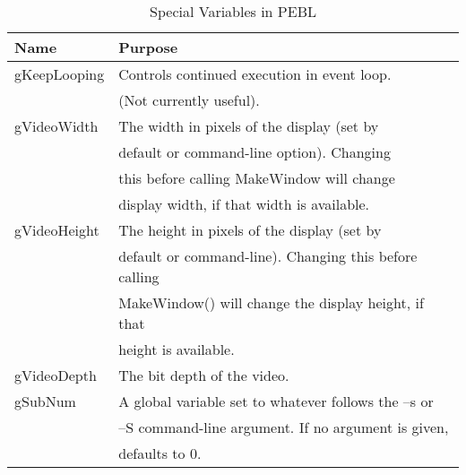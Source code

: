 \begin{table}[htbp]
\caption{Special Variables in PEBL}

\begin{tabular}{ll}
\toprule
\textbf{Name}&\textbf{Purpose}\\
\midrule
gKeepLooping & Controls continued execution in event loop. \\
 &           (Not currently useful).\\
\addlinespace[.2cm]
gVideoWidth  &	The width in pixels of the display (set by\\
             &  default or command-line option). Changing \\
             &  this before calling MakeWindow will change \\
             &  display width, if that width is available. \\
\addlinespace[.2cm]
gVideoHeight & 	The height in pixels of the display (set by\\
             & 	default or command-line). Changing this before calling \\
             &  MakeWindow() will change the display height, if that \\
             &  height is available.\\
\addlinespace[.2cm]
gVideoDepth    &      	The bit depth of the video.\\

\addlinespace[.2cm]
gSubNum      &  A global variable set to whatever follows the --s or \\
             & --S command-line argument.  If no argument is given, \\
             & defaults to 0.\\
\bottomrule
\end{tabular}
\label{tab:special}
\end{table}






